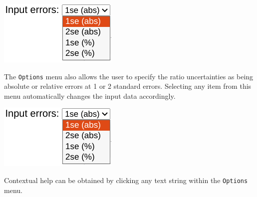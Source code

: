\begin{refsection}
\noindent\begin{minipage}[t]{.25\textwidth}
\strut\vspace*{-\baselineskip}\newline
\includegraphics[width=.85\textwidth]{../figures/ierr.png}
\end{minipage}
\begin{minipage}[t]{.75\textwidth}
The \texttt{Options} menu also allows the user to specify the ratio
uncertainties as being absolute or relative errors at 1 or 2 standard
errors. Selecting any item from this menu automatically changes the
input data accordingly.\\
\end{minipage}

\noindent\begin{minipage}[t]{.25\textwidth}
\strut\vspace*{-\baselineskip}\newline
\includegraphics[width=.85\textwidth]{../figures/ierr.png}\\
\end{minipage}
\begin{minipage}[t]{.75\textwidth}
Contextual help can be obtained by clicking any text string within the
\texttt{Options} menu.
\end{minipage}


\end{refsection}
